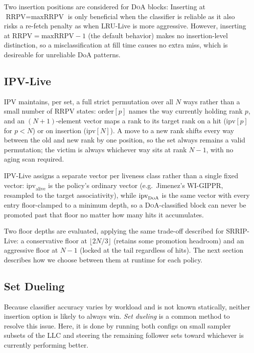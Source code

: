 \documentclass[conference]{IEEEtran}
\newcommand{\srrip}{\textsc{SRRIP}\xspace}
\newcommand{\ipv}{\textsc{IPV}\xspace}
\newcommand{\lru}{\textsc{LRU}\xspace}
\newcommand{\doa}{\textsc{DoA}\xspace}
\newcommand{\llc}{\textsc{LLC}\xspace}
\newcommand{\rrpv}{\textsc{RRPV}\xspace}
\begin{document}
Two insertion positions are considered for \doa blocks:
Inserting at $\text{RRPV}=\text{maxRRPV}$ is only beneficial when the
classifier is reliable as it also risks a re-fetch penalty as when \lru-Live
is more aggressive.
However, inserting at $\text{RRPV}=\text{maxRRPV}-1$ (the default behavior)
makes no insertion-level distinction, so a misclassification at fill time
causes no extra miss, which is desireable for unreliable DoA patterns.

\subsection{IPV-Live}

\ipv maintains, per set, a full strict permutation over all $N$ ways rather
than a small number of \rrpv states: $\text{order}[p]$ names the way currently
holding rank $p$, and an $(N{+}1)$-element vector maps a rank to its target
rank on a hit ($\text{ipv}[p]$ for $p<N$) or on insertion ($\text{ipv}[N]$).
A move to a new rank shifts every way between the old and new rank by one
position, so the set always remains a valid permutation; the victim is
always whichever way sits at rank $N{-}1$, with no aging scan required.

\ipv-Live assigns a separate vector per liveness class rather than a single
fixed vector: $\text{ipv}_{\text{alive}}$ is the policy's ordinary vector
(e.g.\ Jimenez's WI-GIPPR, resampled to the target associativity), while
$\text{ipv}_{\doa}$ is the same vector with every entry floor-clamped to a
minimum depth, so a \doa-classified block can never be promoted past that
floor no matter how many hits it accumulates.

Two floor depths are evaluated, applying the same trade-off described for
\srrip-Live: a conservative floor at $\lfloor 2N/3\rfloor$ (retains some
promotion headroom) and an aggressive floor at $N{-}1$ (locked at the tail
regardless of hits). The next section describes how we choose between them
at runtime for each policy.



\subsection{Set Dueling}
\label{sec:setduelingsection}

Because classifier accuracy varies by workload and is not known statically,
neither insertion option is likely to always win. \emph{Set dueling} is a common 
method to resolve this issue. Here, it is done by running both configs on small sampler 
subsets of  the \llc and steering the remaining follower sets toward whichever is 
currently performing better.
\end{document}
